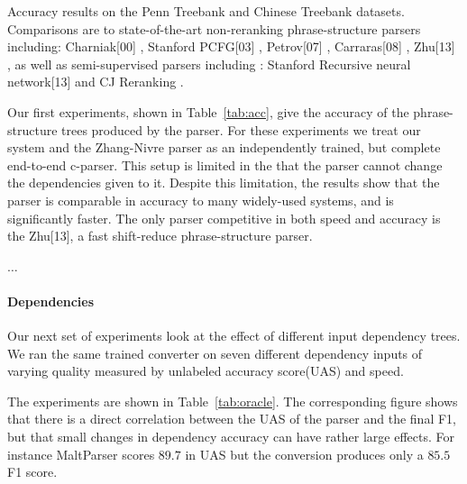 \documentclass[11pt,letterpaper]{article}
\newcommand{\ParseName}{\textsc{ParPar}}
\begin{document}
\begin{table}
  \label{tab:acc}
  \caption{ Accuracy results on the Penn Treebank and Chinese Treebank datasets. Comparisons are to state-of-the-art non-reranking phrase-structure parsers including:  Charniak[00] \cite{charniak2000maximum}, Stanford PCFG[03] \cite{klein2003accurate}, Petrov[07] \cite{petrov2007improved}, Carraras[08] \cite{carreras2008tag}, Zhu[13] \cite{zhu2013fast}, as well as semi-supervised parsers including : Stanford Recursive neural network[13] \cite{socher2013parsing} and CJ Reranking \cite{charniak2005coarse}. }
\end{table}

Our first experiments, shown in Table~\ref{tab:acc}, give the accuracy
of the phrase-structure trees produced by the parser.  For these
experiments we treat our system and the Zhang-Nivre parser as an
independently trained, but complete end-to-end c-parser.  This setup
is limited in the that the parser cannot change the dependencies given
to it. Despite this limitation, the results show that the parser is
comparable in accuracy to many widely-used systems, and is
significantly faster. The only parser competitive in both speed and
accuracy is the Zhu[13], a fast shift-reduce phrase-structure parser.



$\ldots$


\paragraph{Dependencies}

Our next set of experiments look at the effect of different 
input dependency trees. We ran the same trained converter 
on seven different dependency inputs of varying quality measured 
by unlabeled accuracy score(UAS) and speed.

The experiments are shown in Table~\ref{tab:oracle}.
The corresponding figure shows that there is a direct correlation
between the UAS of the parser and the final F1, but that small 
changes in dependency accuracy can have rather large effects.
For instance MaltParser scores $89.7$ in UAS but the conversion
produces only a $85.5$ F1 score. 
\end{document}
